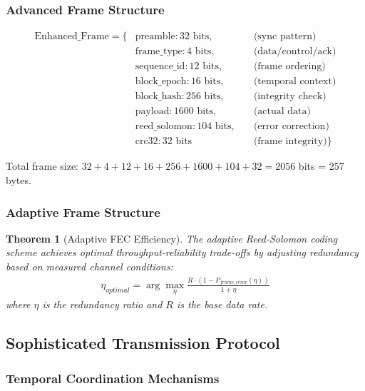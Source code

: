 \documentclass[11pt,a4paper]{article}
\newtheorem{theorem}{Theorem}[section]
\begin{document}
\subsubsection{Advanced Frame Structure}

\begin{align}
\text{Enhanced\_Frame} = \{&\text{preamble}: 32 \text{ bits}, \quad &\text{(sync pattern)}\\
&\text{frame\_type}: 4 \text{ bits}, \quad &\text{(data/control/ack)}\\
&\text{sequence\_id}: 12 \text{ bits}, \quad &\text{(frame ordering)}\\
&\text{block\_epoch}: 16 \text{ bits}, \quad &\text{(temporal context)}\\
&\text{block\_hash}: 256 \text{ bits}, \quad &\text{(integrity check)}\\
&\text{payload}: 1600 \text{ bits}, \quad &\text{(actual data)}\\
&\text{reed\_solomon}: 104 \text{ bits}, \quad &\text{(error correction)}\\
&\text{crc32}: 32 \text{ bits}\quad &\text{(frame integrity)}\}
\end{align}

Total frame size: $32 + 4 + 12 + 16 + 256 + 1600 + 104 + 32 = 2056$ bits = 257 bytes.

\subsubsection{Adaptive Frame Structure}

\begin{theorem}[Adaptive FEC Efficiency]
The adaptive Reed-Solomon coding scheme achieves optimal throughput-reliability trade-offs by adjusting redundancy based on measured channel conditions:
\begin{align}
\eta_{optimal} = \arg\max_\eta \frac{R \cdot (1 - P_{frame\_error}(\eta))}{1 + \eta}
\end{align}
where $\eta$ is the redundancy ratio and $R$ is the base data rate.
\end{theorem}

\subsection{Sophisticated Transmission Protocol}

\subsubsection{Temporal Coordination Mechanisms}
\end{document}
